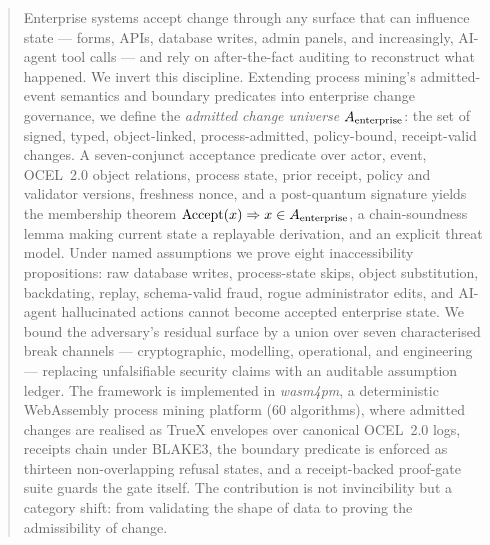 \begin{abstract}
Enterprise systems accept change through any surface that can influence state
--- forms, APIs, database writes, admin panels, and increasingly, AI-agent tool
calls --- and rely on after-the-fact auditing to reconstruct what happened.
We invert this discipline. Extending process mining's admitted-event semantics
and boundary predicates into enterprise change governance, we define the
\emph{admitted change universe} $\Aent$: the set of signed, typed,
object-linked, process-admitted, policy-bound, receipt-valid changes. A
seven-conjunct acceptance predicate over actor, event, OCEL~2.0 object
relations, process state, prior receipt, policy and validator versions,
freshness nonce, and a post-quantum signature yields the membership theorem
$\accept(x) \Rightarrow x \in \Aent$, a chain-soundness lemma making current
state a replayable derivation, and an explicit threat model. Under named
assumptions we prove eight inaccessibility propositions: raw database writes,
process-state skips, object substitution, backdating, replay, schema-valid
fraud, rogue administrator edits, and AI-agent hallucinated actions cannot
become accepted enterprise state. We bound the adversary's residual surface by
a union over seven characterised break channels --- cryptographic, modelling,
operational, and engineering --- replacing unfalsifiable security claims with
an auditable assumption ledger. The framework is implemented in
\emph{wasm4pm}, a deterministic WebAssembly process mining platform (60
algorithms), where admitted changes are realised as TrueX envelopes over
canonical OCEL~2.0 logs, receipts chain under BLAKE3, the boundary predicate
is enforced as thirteen non-overlapping refusal states, and a receipt-backed
proof-gate suite guards the gate itself. The contribution is not invincibility
but a category shift: from validating the shape of data to proving the
admissibility of change.
\end{abstract}

